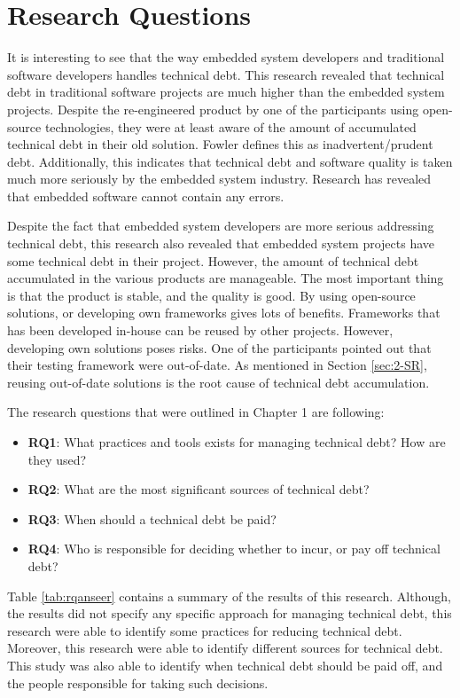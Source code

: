 \section{Research Questions}
It is interesting to see that the way embedded system developers and traditional software developers handles technical debt. This research revealed that technical debt in traditional software projects are much higher than the embedded system projects. Despite the re-engineered product by one of the participants using open-source technologies, they were at least aware of the amount of accumulated technical debt in their old solution. Fowler defines this as inadvertent/prudent debt\cite{url-fowler}. Additionally, this indicates that technical debt and software quality is taken much more seriously by the embedded system industry. Research has revealed that embedded software cannot contain any errors\cite{ebert2009embedded,trienekens2010quality,pretschner2007software}. 

Despite the fact that embedded system developers are more serious addressing technical debt, this research also revealed that embedded system projects have some technical debt in their project. However, the amount of technical debt accumulated in the various products are manageable. The most important thing is that the product is stable, and the quality is good. By using open-source solutions, or developing own frameworks gives lots of benefits. Frameworks that has been developed in-house can be reused by other projects. However, developing own solutions poses risks. One of the participants pointed out that their testing framework were out-of-date. As mentioned in Section \ref{sec:2-SR}, reusing out-of-date solutions is the root cause of technical debt accumulation.

The research questions that were outlined in Chapter 1 are following:
\begin{itemize}
	\item \textbf{RQ1}: What practices and tools exists for managing technical debt? How are they used?
	\item \textbf{RQ2}: What are the most significant sources of technical debt?
	\item \textbf{RQ3}: When should a technical debt be paid?
	\item \textbf{RQ4}: Who is responsible for deciding whether to incur, or pay off technical debt?
\end{itemize}

Table \ref{tab:rqanseer} contains a summary of the results of this research. Although, the results did not specify any specific approach for managing technical debt, this research were able to identify some practices for reducing technical debt. Moreover, this research were able to identify different sources for technical debt. This study was also able to identify when technical debt should be paid off, and the people responsible for taking such decisions.

